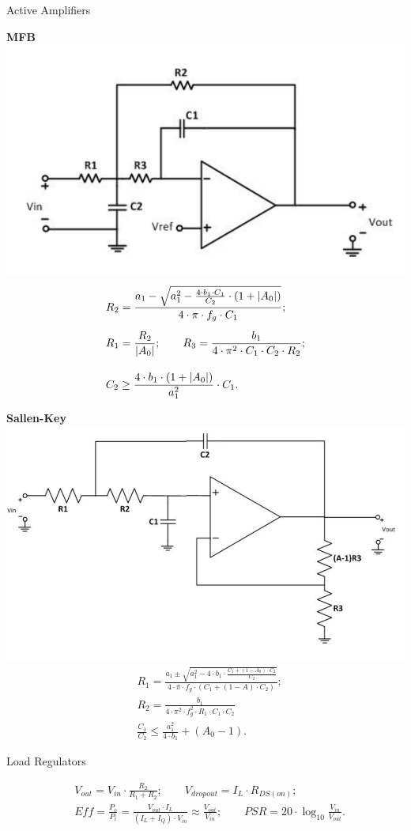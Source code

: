 \documentclass[11pt]{article}
\begin{document}
\begin{sectionbox}{Active Amplifiers}
\vspace{0.3em}
\begin{multicols}{2}
\centering \textbf{MFB} \\[0.7em]
\includegraphics[height=0.25\textwidth]{fig/MFB.png}
\begin{align*}
& R_2 = \frac{a_1 - \sqrt{a_1^2 - \frac{4 \cdot b_1 \cdot C_1}{C_2} \cdot (1 + \mathopen{}\left\lvert A_0\right\rvert)}}{4 \cdot \pi \cdot f_g \cdot C_1}; \\[0.5em]
& R_1 = \frac{R_2}{\mathopen{}\left\lvert A_0\right\rvert}; \qquad
  R_3 = \frac{b_1}{4 \cdot \pi^2 \cdot C_1 \cdot C_2 \cdot R_2}; \\[1em]
& C_2 \geq \frac{4 \cdot b_1 \cdot  (1 + \mathopen{}\left\lvert A_0\right\rvert)}{a_1^2} \cdot C_1.
\end{align*}

\columnbreak

\centering \textbf{Sallen-Key} \\[0.7em]
\includegraphics[height=0.25\textwidth]{fig/Sallen-Key.png}
\begin{align*}
& R_1 = \frac{a_1 \pm \sqrt{a_1^2 - 4 \cdot b_1 \cdot \frac{C_1 + (1 - A_0) \cdot C_2}{C_2}}}{4 \cdot \pi \cdot f_g \cdot (C_1 + (1 - A) \cdot C_2)}; \\[0.5em]
& R_2 = \frac{b_1}{4 \cdot \pi^2 \cdot f_g^2 \cdot R_1 \cdot C_1 \cdot C_2} \\[0.5em]
& \frac{C_1}{C_2} \leq \frac{a_1^2}{4 \cdot b_1} + (A_0 - 1).
\end{align*}
\end{multicols}

\vspace{-0.3em}
\end{sectionbox}

\begin{sectionbox}{Load Regulators}
  
\begin{align*}
& V_{out} = V_{in} \cdot \frac{R_2}{R_1 + R_2}; \qquad
  V_{dropout} = I_L \cdot R_{DS(on)}; \\[0.5em]
& Eff = \frac{P_o}{P_i} = \frac{V_{out} \cdot I_L}{(I_L + I_Q) \cdot V_{in}} \approx \frac{V_{out}}{V_{in}}; \qquad
  PSR = 20 \cdot \log_{10} \frac{V_{in}}{V_{out}}.
\end{align*}
\end{sectionbox}

\end{document}
